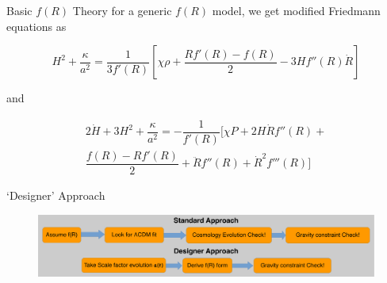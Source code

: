 \documentclass[final,hyperref={pdfpagelabels=false}]{beamer}
\begin{document}
\begin{frame}[t]
\begin{columns}[t]
\begin{column}{.465\textwidth}
\begin{block}{Basic $f(R)$ Theory}
for a generic $f(R)$ model, we get modified Friedmann equations as

\begin{equation}
H^2+\dfrac{\kappa}{a^2}=\dfrac{1}{3f'(R)}\left[\chi \rho+\dfrac{Rf'(R)-f(R)}{2}-3Hf''(R)\dot{R}\right]
\label{modfrw1}
\end{equation}

and 

\begin{multline} 
2\dot{H}+3H^2+\dfrac{\kappa}{a^2}=-\dfrac{1}{f'(R)}\bigg[\chi P+2H\dot{R}f''(R)+\\
\dfrac{f(R)-Rf'(R)}{2}+\ddot{R}f''(R)+\dot{R}^2f'''(R)\bigg]\label{modfrw2}
\end{multline}

\end{block}


\begin{block}{`Designer' Approach }
\begin{figure}
\includegraphics[width=1.0\linewidth]{designer_vs_std}
\end{figure}

\end{block}


\end{column} %


\end{columns}
\end{frame}
\end{document}
